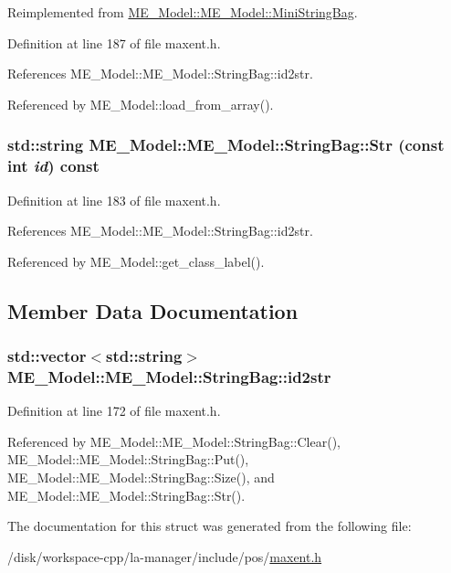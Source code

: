 Reimplemented from \hyperlink{structME__Model_1_1MiniStringBag_1d8f0f0b7cd9749b7173a12fbbccabbc}{ME\_\-Model::ME\_\-Model::MiniStringBag}.

Definition at line 187 of file maxent.h.

References ME\_\-Model::ME\_\-Model::StringBag::id2str.

Referenced by ME\_\-Model::load\_\-from\_\-array().\hypertarget{structME__Model_1_1StringBag_fd579fe2b81e3cdd3a30761b1486ce41}{
\subsubsection[{Str}]{\setlength{\rightskip}{0pt plus 5cm}std::string ME\_\-Model::ME\_\-Model::StringBag::Str (const int {\em id}) const}}
\label{structME__Model_1_1StringBag_fd579fe2b81e3cdd3a30761b1486ce41}




Definition at line 183 of file maxent.h.

References ME\_\-Model::ME\_\-Model::StringBag::id2str.

Referenced by ME\_\-Model::get\_\-class\_\-label().

\subsection{Member Data Documentation}
\hypertarget{structME__Model_1_1StringBag_c0c4fde0a9e8a41153b18a96df8809a2}{
\subsubsection[{id2str}]{\setlength{\rightskip}{0pt plus 5cm}std::vector$<$std::string$>$ ME\_\-Model::ME\_\-Model::StringBag::id2str}}
\label{structME__Model_1_1StringBag_c0c4fde0a9e8a41153b18a96df8809a2}




Definition at line 172 of file maxent.h.

Referenced by ME\_\-Model::ME\_\-Model::StringBag::Clear(), ME\_\-Model::ME\_\-Model::StringBag::Put(), ME\_\-Model::ME\_\-Model::StringBag::Size(), and ME\_\-Model::ME\_\-Model::StringBag::Str().

The documentation for this struct was generated from the following file:\begin{CompactItemize}
\item 
/disk/workspace-cpp/la-manager/include/pos/\hyperlink{maxent_8h}{maxent.h}\end{CompactItemize}
